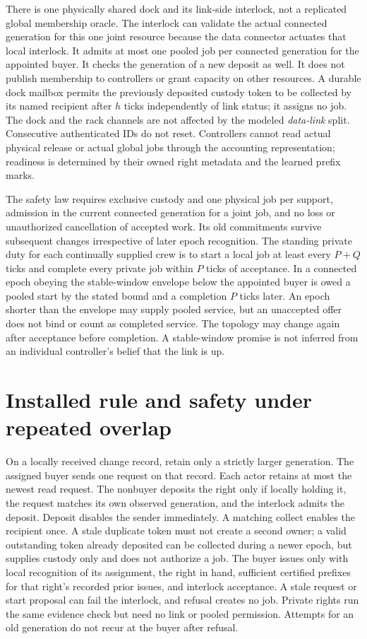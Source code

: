 \documentclass[11pt]{article}
\begin{document}
There is one physically shared dock and its link-side interlock, not a replicated global membership oracle. The interlock can validate the actual connected generation for this one joint resource because the data connector actuates that local interlock. It admits at most one pooled job per connected generation for the appointed buyer. It checks the generation of a new deposit as well. It does not publish membership to controllers or grant capacity on other resources. A durable dock mailbox permits the previously deposited custody token to be collected by its named recipient after $h$ ticks independently of link status; it assigns no job. The dock and the rack channels are not affected by the modeled \emph{data-link} split. Consecutive authenticated IDs do not reset. Controllers cannot read actual physical release or actual global jobs through the accounting representation; readiness is determined by their owned right metadata and the learned prefix marks.

The safety law requires exclusive custody and one physical job per support, admission in the current connected generation for a joint job, and no loss or unauthorized cancellation of accepted work. Its old commitments survive subsequent changes irrespective of later epoch recognition. The standing private duty for each continually supplied crew is to start a local job at least every $P+Q$ ticks and complete every private job within $P$ ticks of acceptance. In a connected epoch obeying the stable-window envelope below the appointed buyer is owed a pooled start by the stated bound and a completion $P$ ticks later. An epoch shorter than the envelope may supply pooled service, but an unaccepted offer does not bind or count as completed service. The topology may change again after acceptance before completion. A stable-window promise is not inferred from an individual controller's belief that the link is up.

\section{Installed rule and safety under repeated overlap}
On a locally received change record, retain only a strictly larger generation. The assigned buyer sends one request on that record. Each actor retains at most the newest read request. The nonbuyer deposits the right only if locally holding it, the request matches its own observed generation, and the interlock admits the deposit. Deposit disables the sender immediately. A matching collect enables the recipient once. A stale duplicate token must not create a second owner; a valid outstanding token already deposited can be collected during a newer epoch, but supplies custody only and does not authorize a job. The buyer issues only with local recognition of its assignment, the right in hand, sufficient certified prefixes for that right's recorded prior issues, and interlock acceptance. A stale request or start proposal can fail the interlock, and refusal creates no job. Private rights run the same evidence check but need no link or pooled permission. Attempts for an old generation do not recur at the buyer after refusal.
\end{document}
